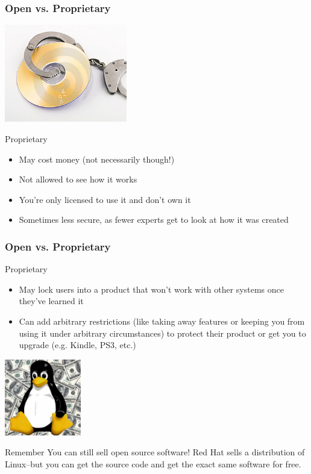 \documentclass{beamer}
\begin{document}
\begin{frame}
  \frametitle{Open vs. Proprietary}
  \begin{center}\includegraphics[width=0.4\textwidth]{img/proprietary}\end{center}  \begin{Large} Proprietary \end{Large}
  \begin{itemize}
  \item May cost \textcolor{beamer@mygreen}{money} (not necessarily though!)
  \item \textcolor{beamer@mygreen}{Not} allowed to see how it works
  \item You're only \textcolor{beamer@mygreen}{licensed} to use it and don't own it
  \item Sometimes less \textcolor{beamer@mygreen}{secure}, as fewer experts get to look at how it was created

  \end{itemize}

\end{frame}

\begin{frame}
  \frametitle{Open vs. Proprietary}
  \begin{Large} Proprietary \end{Large}
  \begin{itemize}
  \item May \textcolor{beamer@mygreen}{lock} users into a product that won't work with other systems once they've learned it
    
  \item Can add arbitrary \textcolor{beamer@mygreen}{restrictions} (like taking away features or keeping you from using it under arbitrary circumstances) to protect their product or get you to upgrade (e.g. Kindle, PS3, etc.)
  \end{itemize}

  \begin{center}\includegraphics[width=0.25\textwidth]{img/tuxmoney}\end{center}
  \begin{block}{Remember}
    You can still sell open source software! Red Hat sells a distribution of Linux--but you can get the source code and get the exact same software for free.
  \end{block}
\end{frame}
\end{document}
